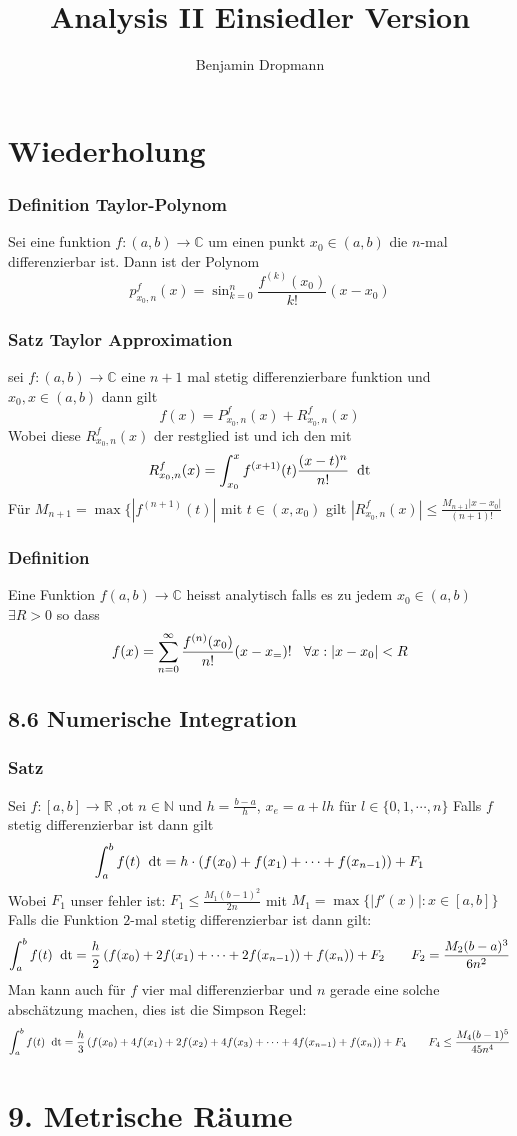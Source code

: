 \documentclass{article}
\title{Analysis II Einsiedler Version}
\author{Benjamin Dropmann}
\newcommand{\mspc}{\hspace{0.7cm}}
\newcommand{\smspc}{\hspace{0.3cm}}
\newcommand{\dd}[1]{\hspace{0.2cm}\text{d{#1}}}
\newcommand{\satz}[1]{\subsubsection*{Satz {#1}}}
\newcommand{\definition}[1]{\subsubsection*{Definition {#1}}}
\begin{document}
\maketitle
\section{Wiederholung}
\definition{Taylor-Polynom} Sei eine funktion $f:(a,b)\rightarrow\mathbb{C}$ um einen punkt $x_0\in (a,b)$ die $n$-mal differenzierbar ist. Dann ist der Polynom 
\[p_{x_0,n}^f(x)=\sin_{k=0}^n\frac{f^{(k)}(x_0)}{k!}(x-x_0)\]
\satz{Taylor Approximation} sei $f:(a,b)\rightarrow\mathbb{C}$ eine $n+1$ mal stetig differenzierbare funktion und $x_0,x\in (a,b)$ dann gilt\[f(x)=P_{x_0,n}^f(x)+R_{x_0,n}^f(x)\]
Wobei diese $R_{x_0,n}^f(x)$ der restglied ist und ich den mit \[R_{x_0,n}^f(x)=\int_{x_0}^xf^{(x+1)}(t)\frac{(x-t)^n}{n!}\dd{t}\]
Für $M_{n+1}=\max\lbrace |f^{(n+1)}(t)|$ mit $t\in (x,x_0)$ gilt $|R_{x_0,n}^f(x)|\le\frac{M_{n+1}|x-x_0|}{(n+1)!}$
\definition{} Eine Funktion $f(a,b)\rightarrow\mathbb{C}$ heisst analytisch falls es zu jedem $x_0\in (a,b)$ $\exists R>0$ so dass \[f(x)=\sum_{n=0}^\infty \frac{f^{(n)}(x_0)}{n!}(x-x_=)!\smspc\forall x:|x-x_0|<R\]
\subsection*{8.6 Numerische Integration}
\satz{} Sei $f:[a,b]\rightarrow\mathbb{R}$ ,ot $n\in \mathbb{N}$ und $h=\frac{b-a}{h}$, $x_e=a+lh$ für  $l\in\lbrace  0,1,\cdots,n\rbrace$  Falls $f$ stetig differenzierbar  ist dann gilt \[\int_a^b f(t)\dd{t}=h\cdot(f(x_0)+f(x_1)+\cdots+f(x_{n-1}))+F_1\] Wobei $F_1$ unser fehler ist: $F_1\le \frac{M_1(b-1)^2}{2n}$
mit $M_1=\max\lbrace|f'(x)|:x\in[a,b]\rbrace$
Falls die Funktion $2$-mal stetig differenzierbar ist dann gilt: 
\[\int_a^bf(t)\dd{t}=\frac{h}{2}\left(f(x_0)+2f(x_1)+\cdots+2f(x_{n-1}))+f(x_n)\right)+F_2\mspc F_2=\frac{M_2(b-a)^3}{6n^2}\]
Man kann auch für $f$ vier mal differenzierbar und $n$ gerade eine solche abschätzung machen, dies ist die Simpson Regel:
\[\int_a^b f(t)\dd{t}=\frac{h}{3}\left(f(x_0)+4f(x_1)+2f(x_2)+4f(x_3)+\cdots+4f(x_{n-1})+f(x_n)\right)+F_4\mspc F_4\le\frac{M_4(b-1)^5}{45n^4}\]
\section*{9. Metrische Räume}
\end{document}
